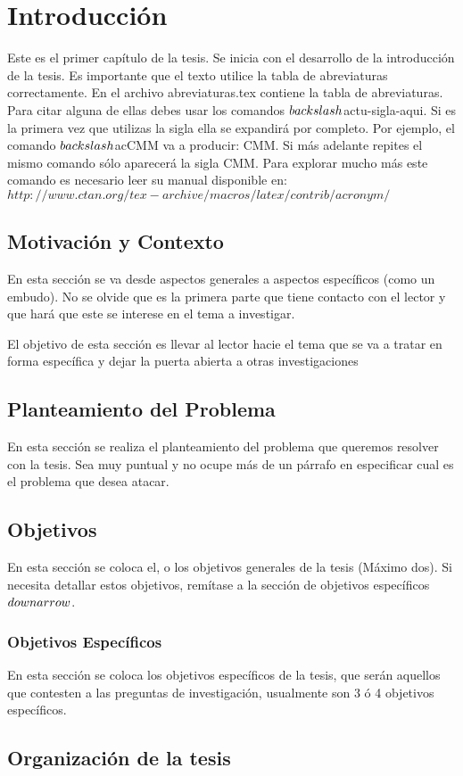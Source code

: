 \chapter{Introducción}

Este es el primer capítulo de la tesis. Se inicia con el desarrollo de la introducción de la tesis. Es importante que el texto utilice la tabla de abreviaturas correctamente. En el archivo abreviaturas.tex contiene la tabla de abreviaturas. Para citar alguna de ellas debes usar los comandos $\\backslash$ac{tu-sigla-aqui}. Si es la primera vez que utilizas la sigla ella se expandirá por completo. Por ejemplo, el comando $\\backslash$ac{CMM} va a producir: \ac{CMM}. Si más adelante repites el mismo comando sólo aparecerá la sigla \ac{CMM}. Para explorar mucho más este comando es necesario leer su manual disponible en: $http://www.ctan.org/tex-archive/macros/latex/contrib/acronym/$


\section{Motivación y Contexto}

En esta sección se va desde aspectos generales a  aspectos específicos (como un embudo). No se olvide que es la primera parte que tiene contacto con el lector y que hará que este se interese en el tema a investigar.

El objetivo de esta sección es llevar al lector hacie el tema que se va a tratar en forma específica y dejar la puerta abierta a otras investigaciones

\section{Planteamiento del Problema}

En esta sección se realiza el planteamiento del problema que queremos resolver con la tesis. Sea muy puntual y no ocupe más de un párrafo en especificar cual es el problema que desea atacar.

\section{Objetivos}

En esta sección se coloca el, o los objetivos generales de la tesis (Máximo dos). Si necesita detallar estos objetivos, remítase a la sección de objetivos específicos $\\downarrow$.

\subsection{Objetivos Específicos}

En esta sección se coloca los objetivos específicos de la tesis, que serán aquellos que contesten a las preguntas de investigación, usualmente son 3 ó 4 objetivos específicos.

\section{Organización de la tesis}
